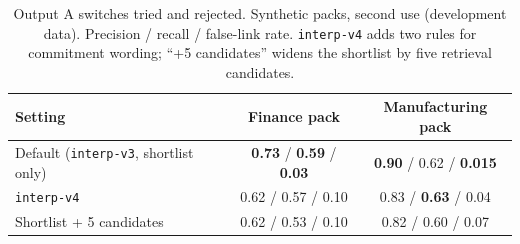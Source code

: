 \begin{table}[H]
\centering\small
\caption{Output A switches tried and rejected. Synthetic packs, second use (development data). Precision / recall / false-link rate. \texttt{interp-v4} adds two rules for commitment wording; ``+5 candidates'' widens the shortlist by five retrieval candidates.}
\label{tab:outputA-switches}
\begin{tabular}{lcc}
\toprule
Setting & Finance pack & Manufacturing pack\\\midrule
Default (\texttt{interp-v3}, shortlist only) & \textbf{0.73} / \textbf{0.59} / \textbf{0.03} & \textbf{0.90} / 0.62 / \textbf{0.015}\\
\texttt{interp-v4} & 0.62 / 0.57 / 0.10 & 0.83 / \textbf{0.63} / 0.04\\
Shortlist + 5 candidates & 0.62 / 0.53 / 0.10 & 0.82 / 0.60 / 0.07\\
\bottomrule
\end{tabular}
\end{table}
